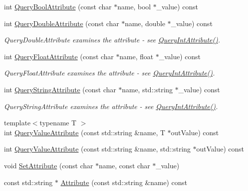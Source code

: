\begin{DoxyCompactItemize}
int \hyperlink{class_ti_xml_element_af4a1d3f88c28eb0f3115dc39ebd83fff}{Query\-Bool\-Attribute} (const char $\ast$name, bool $\ast$\-\_\-value) const 
\item 
int \hyperlink{class_ti_xml_element_a898d7730ecc341f0bffc7a9dadbf1ce7}{Query\-Double\-Attribute} (const char $\ast$name, double $\ast$\-\_\-value) const 
\begin{DoxyCompactList}\small\item\em Query\-Double\-Attribute examines the attribute -\/ see \hyperlink{class_ti_xml_element_aea0bfe471380f281c5945770ddbf52b9}{Query\-Int\-Attribute()}. \end{DoxyCompactList}\item 
int \hyperlink{class_ti_xml_element_aa04d3af11601ef5a5f88295203a843be}{Query\-Float\-Attribute} (const char $\ast$name, float $\ast$\-\_\-value) const 
\begin{DoxyCompactList}\small\item\em Query\-Float\-Attribute examines the attribute -\/ see \hyperlink{class_ti_xml_element_aea0bfe471380f281c5945770ddbf52b9}{Query\-Int\-Attribute()}. \end{DoxyCompactList}\item 
int \hyperlink{class_ti_xml_element_a14321ac360efe906ed449d9db3fd9961}{Query\-String\-Attribute} (const char $\ast$name, std\-::string $\ast$\-\_\-value) const 
\begin{DoxyCompactList}\small\item\em Query\-String\-Attribute examines the attribute -\/ see \hyperlink{class_ti_xml_element_aea0bfe471380f281c5945770ddbf52b9}{Query\-Int\-Attribute()}. \end{DoxyCompactList}\item 
{\footnotesize template$<$typename T $>$ }\\int \hyperlink{class_ti_xml_element_a676f888438f8eb8d69a695ead195edb8}{Query\-Value\-Attribute} (const std\-::string \&name, T $\ast$out\-Value) const 
\item 
int \hyperlink{class_ti_xml_element_a93fb47dab50d5f0d2912b789648c48ca}{Query\-Value\-Attribute} (const std\-::string \&name, std\-::string $\ast$out\-Value) const 
\item 
void \hyperlink{class_ti_xml_element_abf0b3bd7f0e4c746a89ec6e7f101fc32}{Set\-Attribute} (const char $\ast$name, const char $\ast$\-\_\-value)
\item 
const std\-::string $\ast$ \hyperlink{class_ti_xml_element_a83b8b18d6ca253649ce378f8f5a2da49}{Attribute} (const std\-::string \&name) const 

\end{DoxyCompactItemize}
